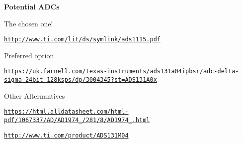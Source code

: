 {\bfseries Potential A\+DC\textquotesingle{}s}

The chosen one!

\href{http://www.ti.com/lit/ds/symlink/ads1115.pdf}{\tt http\+://www.\+ti.\+com/lit/ds/symlink/ads1115.\+pdf}

Preferred option

\href{https://uk.farnell.com/texas-instruments/ads131a04ipbsr/adc-delta-sigma-24bit-128ksps/dp/3004345?st=ADS131A0x}{\tt https\+://uk.\+farnell.\+com/texas-\/instruments/ads131a04ipbsr/adc-\/delta-\/sigma-\/24bit-\/128ksps/dp/3004345?st=\+A\+D\+S131\+A0x}

Other Alternantives

\href{https://html.alldatasheet.com/html-pdf/1067337/AD/AD1974_13/281/8/AD1974_13.html}{\tt https\+://html.\+alldatasheet.\+com/html-\/pdf/1067337/\+A\+D/\+A\+D1974\+\_/281/8/\+A\+D1974\+\_.\+html}

\href{http://www.ti.com/product/ADS131M04}{\tt http\+://www.\+ti.\+com/product/\+A\+D\+S131\+M04} 